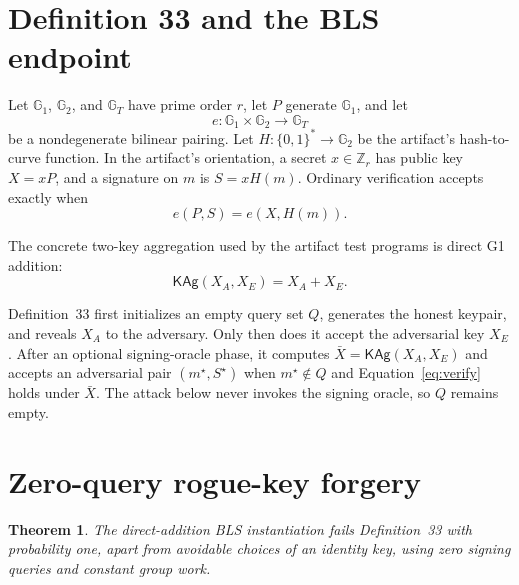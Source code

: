 \documentclass[10pt,a4paper]{article}
\newtheorem{theorem}{Theorem}
\newcommand{\GOne}{\mathbb{G}_1}
\newcommand{\GTwo}{\mathbb{G}_2}
\newcommand{\GT}{\mathbb{G}_T}
\newcommand{\Zr}{\mathbb{Z}_r}
\newcommand{\KAg}{\mathsf{KAg}}
\begin{document}
\section{Definition 33 and the BLS endpoint}

Let $\GOne$, $\GTwo$, and $\GT$ have prime order $r$, let $P$ generate
$\GOne$, and let
\[
 e:\GOne\times\GTwo\longrightarrow\GT
\]
be a nondegenerate bilinear pairing. Let $H:\{0,1\}^*\to\GTwo$ be the
artifact's hash-to-curve function. In the artifact's orientation, a secret
$x\in\Zr$ has public key $X=xP$, and a signature on $m$ is
$S=xH(m)$. Ordinary verification accepts exactly when
\begin{equation}
  e(P,S)=e(X,H(m)).                                    \label{eq:verify}
\end{equation}

The concrete two-key aggregation used by the artifact test programs is direct
G1 addition:
\begin{equation}
  \KAg(X_A,X_E)=X_A+X_E.                               \label{eq:kag}
\end{equation}

Definition~33 first initializes an empty query set $Q$, generates the honest
keypair, and reveals $X_A$ to the adversary. Only then does it accept the
adversarial key $X_E$. After an optional signing-oracle phase, it computes
$\bar X=\KAg(X_A,X_E)$ and accepts an adversarial pair $(m^\star,S^\star)$
when $m^\star\notin Q$ and Equation~\eqref{eq:verify} holds under $\bar X$.
The attack below never invokes the signing oracle, so $Q$ remains empty.

\section{Zero-query rogue-key forgery}

\begin{theorem}
The direct-addition BLS instantiation fails Definition~33 with probability
one, apart from avoidable choices of an identity key, using zero signing
queries and constant group work.
\end{theorem}
\end{document}
